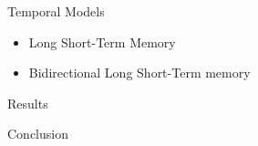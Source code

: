 \documentclass{beamer}
\begin{document}
\begin{frame}{Temporal Models}
    \begin{itemize}
        \item Long Short-Term Memory 
    \end{itemize}
    \begin{itemize}
        \item Bidirectional Long Short-Term memory 
    \end{itemize}
\end{frame}

\begin{frame}{Results}
\end{frame}

\begin{frame}{Conclusion}
\end{frame}



\end{document}
